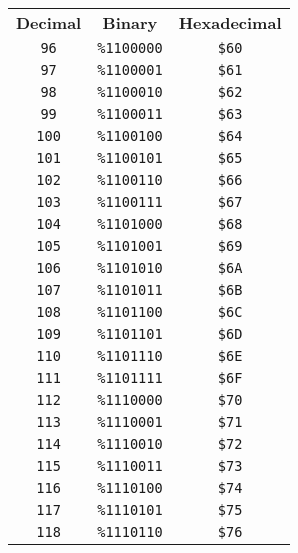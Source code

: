 \begin{multicols}{2}
\begin{center}
  \begin{tabular}{|c|c|c|}
  \hline
		\textbf{Decimal} & \textbf{Binary} & \textbf{Hexadecimal} \\ \hhline{|=|=|=|}   
 \texttt{96} & \texttt{\%1100000} &  \texttt{\$60} \\ \hline
 \texttt{97} & \texttt{\%1100001} &  \texttt{\$61} \\ \hline
 \texttt{98} & \texttt{\%1100010} &  \texttt{\$62} \\ \hline
 \texttt{99} & \texttt{\%1100011} &  \texttt{\$63} \\ \hline
 \texttt{100} & \texttt{\%1100100} &  \texttt{\$64} \\ \hline
 \texttt{101} & \texttt{\%1100101} &  \texttt{\$65} \\ \hline
 \texttt{102} & \texttt{\%1100110} &  \texttt{\$66} \\ \hline
 \texttt{103} & \texttt{\%1100111} &  \texttt{\$67} \\ \hline
 \texttt{104} & \texttt{\%1101000} &  \texttt{\$68} \\ \hline
 \texttt{105} & \texttt{\%1101001} &  \texttt{\$69} \\ \hline
 \texttt{106} & \texttt{\%1101010} &  \texttt{\$6A} \\ \hline
 \texttt{107} & \texttt{\%1101011} &  \texttt{\$6B} \\ \hline
 \texttt{108} & \texttt{\%1101100} &  \texttt{\$6C} \\ \hline
 \texttt{109} & \texttt{\%1101101} &  \texttt{\$6D} \\ \hline
 \texttt{110} & \texttt{\%1101110} &  \texttt{\$6E} \\ \hline
 \texttt{111} & \texttt{\%1101111} &  \texttt{\$6F} \\ \hline
 \texttt{112} & \texttt{\%1110000} &  \texttt{\$70} \\ \hline
 \texttt{113} & \texttt{\%1110001} &  \texttt{\$71} \\ \hline
 \texttt{114} & \texttt{\%1110010} &  \texttt{\$72} \\ \hline
 \texttt{115} & \texttt{\%1110011} &  \texttt{\$73} \\ \hline
 \texttt{116} & \texttt{\%1110100} &  \texttt{\$74} \\ \hline
 \texttt{117} & \texttt{\%1110101} &  \texttt{\$75} \\ \hline
 \texttt{118} & \texttt{\%1110110} &  \texttt{\$76} \\ \hline

\end{tabular}
\end{center}
\end{multicols}
